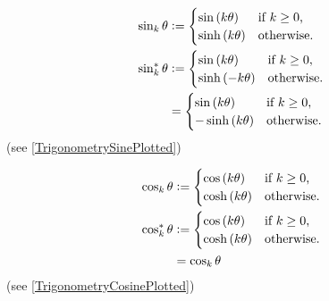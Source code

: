 \documentclass[stu, babel, american, biblatex, a4paper, leqno, draftall]{apa7}
\begin{document}
\begin{example}\label{M:Trigonometry:Sine}
    \begin{align*}
        \sin_k{\theta} & \vcentcolon=
        \begin{cases}
            \sin\left(k\theta\right)  & \text{if $k\geq0$,} \\
            \sinh\left(k\theta\right) & \text{otherwise.}   \\
        \end{cases} \\
        \sin_k^\ast{\theta} & \vcentcolon=
        \begin{cases}
            \sin\left(k\theta\right)  & \text{if $k\geq0$,} \\
            \sinh\left(-k\theta\right) & \text{otherwise.}   \\
        \end{cases} \\
        & =
        \begin{cases}
            \sin\left(k\theta\right)  & \text{if $k\geq0$,} \\
            -\sinh\left(k\theta\right) & \text{otherwise.}   \\
        \end{cases}
    \end{align*}
    (see \cref{TrigonometrySinePlotted})
\end{example}
\begin{example}\label{M:Trigonometry:Cosine}
    \begin{align*}
        \cos_k{\theta} & \vcentcolon=
        \begin{cases}
            \cos\left(k\theta\right)  & \text{if $k\geq0$,} \\
            \cosh\left(k\theta\right) & \text{otherwise.}   \\
        \end{cases} \\
        \cos_k^\ast{\theta} & \vcentcolon=
        \begin{cases}
            \cos\left(k\theta\right)  & \text{if $k\geq0$,} \\
            \cosh\left(k\theta\right) & \text{otherwise.}   \\
        \end{cases} \\
        & = \cos_k{\theta}
    \end{align*}
    (see \cref{TrigonometryCosinePlotted})
\end{example}
\end{document}
